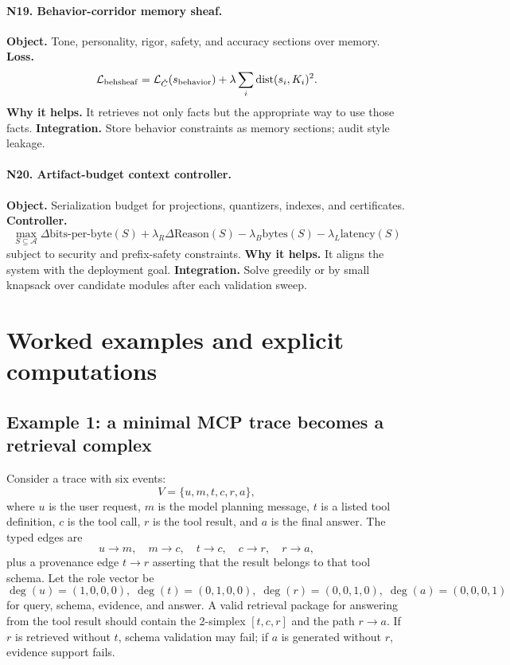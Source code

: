 \documentclass[11pt]{article}
\newcommand{\dist}{\operatorname{dist}}
\newcommand{\bitsperbyte}{\mathrm{bits\mbox{-}per\mbox{-}byte}}
\newcommand{\loss}{\mathcal{L}}
\numberwithin{equation}{section}
\begin{document}
\paragraph{N19. Behavior-corridor memory sheaf.}
\textbf{Object.} Tone, personality, rigor, safety, and accuracy sections over memory. \textbf{Loss.}
\begin{equation}
\loss_{\rm behsheaf}=\loss_{\check C}(s_{\rm behavior})+\lambda\sum_i\dist(s_i,K_i)^2.
\end{equation}
\textbf{Why it helps.} It retrieves not only facts but the appropriate way to use those facts. \textbf{Integration.} Store behavior constraints as memory sections; audit style leakage.

\paragraph{N20. Artifact-budget context controller.}
\textbf{Object.} Serialization budget for projections, quantizers, indexes, and certificates. \textbf{Controller.}
\begin{equation}
\max_{S\subseteq\mathcal{A}} \Delta\bitsperbyte(S)+\lambda_R\Delta\mathrm{Reason}(S)-\lambda_B\mathrm{bytes}(S)-\lambda_L\mathrm{latency}(S)
\end{equation}
subject to security and prefix-safety constraints. \textbf{Why it helps.} It aligns the system with the deployment goal. \textbf{Integration.} Solve greedily or by small knapsack over candidate modules after each validation sweep.


\clearpage
\section{Worked examples and explicit computations}
\subsection{Example 1: a minimal MCP trace becomes a retrieval complex}
Consider a trace with six events:
\begin{equation}
V=\{u,m,t,c,r,a\},
\end{equation}
where $u$ is the user request, $m$ is the model planning message, $t$ is a listed tool definition, $c$ is the tool call, $r$ is the tool result, and $a$ is the final answer. The typed edges are
\begin{equation}
 u\to m,\quad m\to c,\quad t\to c,\quad c\to r,\quad r\to a,
\end{equation}
plus a provenance edge $t\to r$ asserting that the result belongs to that tool schema. Let the role vector be
\begin{equation}
\deg(u)=(1,0,0,0),\;\deg(t)=(0,1,0,0),\;\deg(r)=(0,0,1,0),\;\deg(a)=(0,0,0,1)
\end{equation}
for query, schema, evidence, and answer. A valid retrieval package for answering from the tool result should contain the 2-simplex $[t,c,r]$ and the path $r\to a$. If $r$ is retrieved without $t$, schema validation may fail; if $a$ is generated without $r$, evidence support fails.
\end{document}
